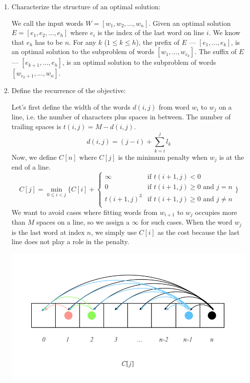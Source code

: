\documentclass[11pt]{article}
\theoremstyle{definition}
\theoremstyle{theorem}
\newcommand{\solution}{\medskip\noindent{\color{DarkBlue}\textbf{Solution:}}}
\begin{document}
\solution
\begin{enumerate}[label=(\arabic*)]
\item Characterize the structure of an optimal solution:

We call the input words $W = [w_1, w_2, ..., w_n]$. Given an optimal solution $E = [e_1, e_2, ..., e_h]$ where $e_i$ is the index of the last word on line $i$. We know that $e_h$ has to be $n$. For any $k$ ($1\le k \le h$), the prefix of $E$ --- $[e_1, ..., e_{k}]$, is an optimal solution to the subproblem of words $[w_1, ..., w_{e_{k}}]$. The suffix of $E$ --- $[e_{k+1}, ..., e_{h}]$, is an optimal solution to the subproblem of words $[w_{e_{k}+1}, ..., w_n]$.

\item Define the recurrence of the objective:

Let's first define the width of the words $d(i, j)$ from word $w_i$ to $w_j$ on a line, i.e. the number of characters plus spaces in between. The number of trailing spaces is $t(i, j) = M - d(i, j)$.
\[
d(i, j) = (j - i) + \sum_{k=i}^j l_k
\]
Now, we define $C[n]$ where $C[j]$ is the minimum penalty when $w_j$ is at the end of a line.
\[
C[j] = \min_{0 \le i < j} \big\{ {C[i] + 
\begin{cases}
\infty 		&\mbox{if } t(i + 1, j) < 0 \\
0  			&\mbox{if } t(i + 1, j) \ge 0 \text{ and } j = n \\
t(i + 1, j)^3 	&\mbox{if } t(i + 1, j) \ge 0 \text{ and } j \ne n \\
\end{cases}}
\big\}
\]
We want to avoid cases where fitting words from $w_{i+1}$ to $w_j$ occupies more than $M$ spaces on a line, so we assign a $\infty$ for such cases. When the word $w_j$ is the last word at index $n$, we simply use $C[i]$ as the cost because the last line does not play a role in the penalty. 

\includegraphics[scale=0.85]{./hw6q5.png}


\end{enumerate}
\end{document}
